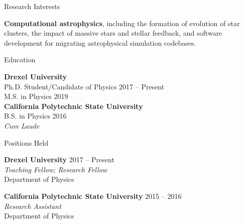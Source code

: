 \documentclass{resume} %
\begin{document}


\begin{rSection}{Research Interests}

\textbf{Computational astrophysics}, including the formation of evolution of star clusters, the impact of massive stars and stellar feedback, and software development for migrating astrophysical simulation codebases.

\end{rSection}


\begin{rSection}{Education}

\textbf{Drexel University} \\%
{\color{MidnightBlue} Ph.D.} Student/Candidate of Physics \hfill {2017 -- Present} \\
{\color{MidnightBlue} M.S.} in Physics \hfill{2019}\\
\textbf{California Polytechnic State University} \\%
{\color{MidnightBlue} B.S.} in Physics \hfill{2016}\\
\textit{Cum Laude}

\end{rSection}


\begin{rSection}{Positions Held}

\textbf{Drexel University} \hfill {2017 -- Present} \\
\textit{Teaching Fellow; Research Fellow}\\
Department of Physics

\textbf{California Polytechnic State University} \hfill {2015 -- 2016}\\
\textit{Research Assistant}\\
Department of Physics

\end{rSection}
\end{document}
